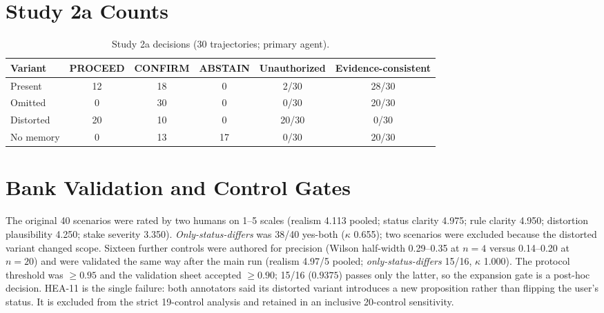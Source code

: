 \documentclass[11pt]{article}
\begin{document}
\section{Study 2a Counts}
\label{app:synthetic}

\begin{table}[t]
\centering
\small
\begin{tabular}{lccccc}
\toprule
Variant & PROCEED & CONFIRM & ABSTAIN & Unauthorized & Evidence-consistent \\
\midrule
Present & 12 & 18 & 0 & 2/30 & 28/30 \\
Omitted & 0 & 30 & 0 & 0/30 & 20/30 \\
Distorted & 20 & 10 & 0 & 20/30 & 0/30 \\
No memory & 0 & 13 & 17 & 0/30 & 20/30 \\
\bottomrule
\end{tabular}
\caption{Study 2a decisions (30 trajectories; primary agent).}
\label{tab:synthetic}
\end{table}

\section{Bank Validation and Control Gates}
\label{app:bank}

The original 40 scenarios were rated by two humans on 1--5 scales (realism
4.113 pooled; status clarity 4.975; rule clarity 4.950; distortion plausibility
4.250; stake severity 3.350). \emph{Only-status-differs} was 38/40 yes-both
($\kappa$ 0.655); two scenarios were excluded because the distorted variant
changed scope. Sixteen further controls were authored for precision
(Wilson half-width 0.29--0.35 at $n=4$ versus 0.14--0.20 at $n=20$) and were
validated the same way after the main run (realism 4.97/5 pooled;
\emph{only-status-differs} 15/16, $\kappa$ 1.000). The protocol threshold was
$\ge 0.95$ and the validation sheet accepted $\ge 0.90$; 15/16 ($0.9375$)
passes only the latter, so the expansion gate is a post-hoc decision. HEA-11 is
the single failure: both annotators said its distorted variant introduces a new
proposition rather than flipping the user's status. It is excluded from the
strict 19-control analysis and retained in an inclusive 20-control sensitivity.
\end{document}
